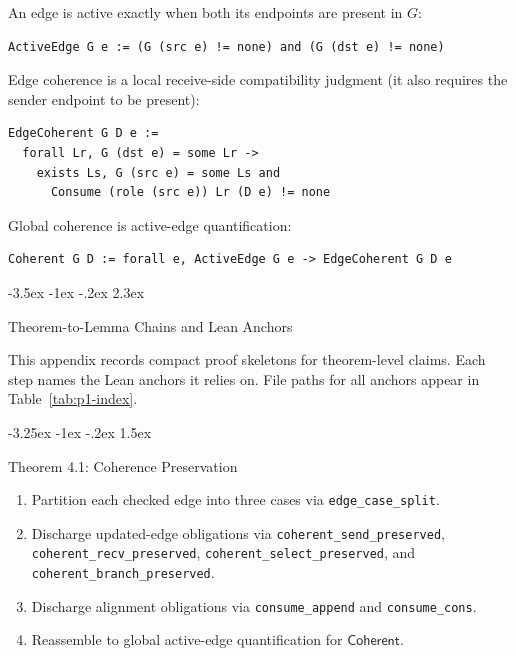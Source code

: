 \documentclass[a4paper,10pt,twocolumn,english]{article}
\makeatletter
\renewcommand{\section}{\@startsection{section}{1}{\z@}%
  {-3.5ex \@plus -1ex \@minus -.2ex}%
  {2.3ex}%
  {\raggedright\normalfont\large\bfseries}}
\renewcommand{\subsection}{\@startsection{subsection}{2}{\z@}%
  {-3.25ex \@plus -1ex \@minus -.2ex}%
  {1.5ex}%
  {\raggedright\normalfont\normalsize\bfseries}}
\numberwithin{equation}{section}
\theoremstyle{paperdef}
\theoremstyle{paperplain}
\theoremstyle{paperdef}
\theoremstyle{paperremark}
\newcommand{\Coherent}{\ensuremath{\mathsf{Coherent}}}
\makeatother
\begin{document}
An edge is active exactly when both its endpoints are present in $G$:

\noindent\begin{minipage}{\columnwidth}
	\begin{lstlisting}
ActiveEdge G e := (G (src e) != none) and (G (dst e) != none)
\end{lstlisting}
\end{minipage}

Edge coherence is a local receive-side compatibility judgment (it also requires the sender endpoint to be present):

\noindent\begin{minipage}{\columnwidth}
	\begin{lstlisting}
EdgeCoherent G D e :=
  forall Lr, G (dst e) = some Lr ->
    exists Ls, G (src e) = some Ls and
      Consume (role (src e)) Lr (D e) != none
\end{lstlisting}
\end{minipage}

Global coherence is active-edge quantification:

\noindent\begin{minipage}{\columnwidth}
	\begin{lstlisting}
Coherent G D := forall e, ActiveEdge G e -> EdgeCoherent G D e
\end{lstlisting}
\end{minipage}

\section{Theorem-to-Lemma Chains and Lean Anchors}
\label{app:chains}

This appendix records compact proof skeletons for theorem-level claims. Each step names the Lean anchors it relies on. File paths for all anchors appear in Table~\ref{tab:p1-index}.

\subsection{Theorem 4.1: Coherence Preservation}

\begin{enumerate}
	\item Partition each checked edge into three cases via \nolinkurl{edge_case_split}.
	\item Discharge updated-edge obligations via \nolinkurl{coherent_send_preserved}, \nolinkurl{coherent_recv_preserved}, \nolinkurl{coherent_select_preserved}, and \nolinkurl{coherent_branch_preserved}.
	\item Discharge alignment obligations via \nolinkurl{consume_append} and \nolinkurl{consume_cons}.
	\item Reassemble to global active-edge quantification for \Coherent.
\end{enumerate}
\end{document}

